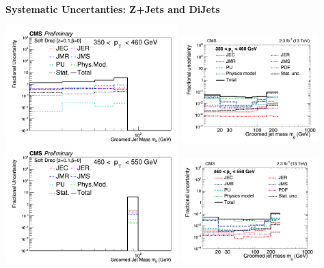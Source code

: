 \documentclass{beamer}
\begin{document}
\begin{frame}{\textbf{Systematic Uncertanties: Z+Jets and DiJets}}


\includegraphics[width=0.5\textwidth]{Jun25_unfoldPlots_sdB0/AllSystematics_FractionofUnfoldedBinContent_ptbin4MC_mass_Ptbin350to460_Detbinning_Groomingis_sdB0.png}%
\includegraphics[width=0.4\textwidth]{dijet350.png}
\newline
\includegraphics[width=0.5\textwidth]{Jun25_unfoldPlots_sdB0/AllSystematics_FractionofUnfoldedBinContent_ptbin5MC_mass_Ptbin460to550_Detbinning_Groomingis_sdB0.png}%
\includegraphics[width=0.4\textwidth]{dijet460.png}



\end{frame}
\end{document}
